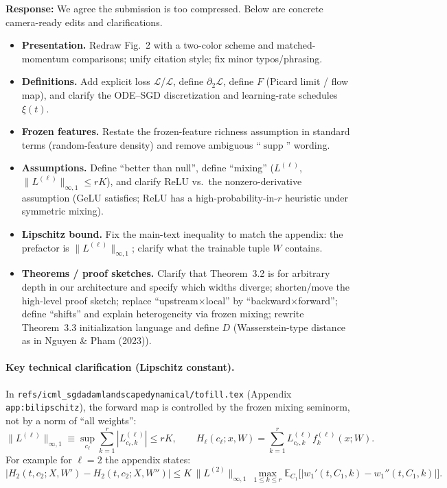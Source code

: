 \documentclass[11pt,a4paper]{article}
\newcommand{\NP}{Nguyen \& Pham (2023)}
\begin{document}
\textbf{Response:} We agree the submission is too compressed. Below are concrete camera-ready edits and clarifications.
\begin{itemize}
  \item \textbf{Presentation.} Redraw Fig.~2 with a two-color scheme and matched-momentum comparisons; unify citation style; fix minor typos/phrasing.
  \item \textbf{Definitions.} Add explicit loss $\mathscr{L}$/$\mathcal{L}$, define $\partial_2\mathcal{L}$, define $F$ (Picard limit / flow map), and clarify the ODE--SGD discretization and learning-rate schedules $\xi(t)$.
  \item \textbf{Frozen features.} Restate the frozen-feature richness assumption in standard terms (random-feature density) and remove ambiguous ``$\operatorname{supp}$'' wording.
  \item \textbf{Assumptions.} Define ``better than null'', define ``mixing'' ($L^{(\ell)}$, $\|L^{(\ell)}\|_{\infty,1}\le rK$), and clarify ReLU vs.\ the nonzero-derivative assumption (GeLU satisfies; ReLU has a high-probability-in-$r$ heuristic under symmetric mixing).
  \item \textbf{Lipschitz bound.} Fix the main-text inequality to match the appendix: the prefactor is $\|L^{(\ell)}\|_{\infty,1}$; clarify what the trainable tuple $W$ contains.
  \item \textbf{Theorems / proof sketches.} Clarify that Theorem~3.2 is for arbitrary depth in our architecture and specify which widths diverge; shorten/move the high-level proof sketch; replace ``upstream$\times$local'' by ``backward$\times$forward''; define ``shifts'' and explain heterogeneity via frozen mixing; rewrite Theorem~3.3 initialization language and define $D$ (Wasserstein-type distance as in \NP{}).
\end{itemize}

\paragraph{Key technical clarification (Lipschitz constant).}
In \texttt{refs/icml\_sgdadamlandscapedynamical/tofill.tex} (Appendix \texttt{app:bilipschitz}), the forward map is controlled by the frozen mixing seminorm, not by a norm of ``all weights'':
\[
\|L^{(\ell)}\|_{\infty,1}\equiv \sup_{c_\ell}\sum_{k=1}^r |L^{(\ell)}_{c_\ell,k}|\le rK,
\qquad
H_\ell(c_\ell;x,W)=\sum_{k=1}^r L^{(\ell)}_{c_\ell,k} f_k^{(\ell)}(x;W).
\]
For example for $\ell=2$ the appendix states:
\[
\big|H_2(t,c_2;X,W')-H_2(t,c_2;X,W'')\big|
\le
K\,\|L^{(2)}\|_{\infty,1}\,\max_{1\le k\le r}\mathbb{E}_{C_1}\big[|w_1'(t,C_1,k)-w_1''(t,C_1,k)|\big].
\]
\end{document}
